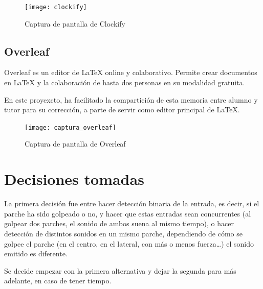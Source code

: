             \begin{figure}[ht]
                \centering
                \texttt{[image: clockify]}
                \caption{Captura de pantalla de Clockify \label{fig:ClockifyCaptura}}
            \end{figure}
        

        \subsection{Overleaf} %
        \label{sub:Overleaf}

            Overleaf es un editor de LaTeX online y colaborativo. Permite crear documentos en LaTeX y la colaboración de
            hasta dos personas en su modalidad gratuita.

            En este proyexcto, ha facilitado la compartición de esta memoria entre alumno y tutor para su corrección, a
            parte de servir como editor principal de LaTeX.

            \begin{figure}[ht]
                \centering
                \texttt{[image: captura\_overleaf]}
                \caption{Captura de pantalla de Overleaf \label{fig:OverleafCaptura}}
            \end{figure}
        


    \section{Decisiones tomadas} %
    \label{sec:DecisionesTomadas}

        La primera decisión fue entre hacer detección binaria de la entrada, es decir, si el parche ha sido golpeado o
        no, y hacer que estas entradas sean concurrentes (al golpear dos parches, el sonido de ambos suena al mismo
        tiempo), o hacer detección de distintos sonidos en un mismo parche, dependiendo de cómo se golpee el parche (en
        el centro, en el lateral, con más o menos fuerza…) el sonido emitido es diferente.\newline

        Se decide empezar con la primera alternativa y dejar la segunda para más adelante, en caso de tener tiempo.

